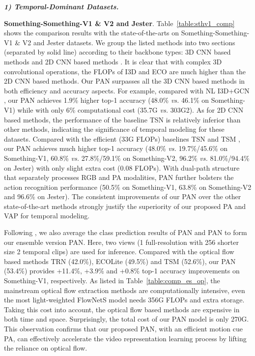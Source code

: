 \documentclass[journal]{IEEEtran}
\begin{document}
\emph{\textbf{1) Temporal-Dominant Datasets.}}

\textbf{Something-Something-V1 \& V2 and Jester}. Table~\ref{table:sthv1_comp} shows the comparison results with the state-of-the-arts on Something-Something-V1 \& V2 and Jester datasets. We group the listed methods into two sections (separated by solid line) according to their backbone types: 3D CNN based methods \cite{wang2018videos,zolfaghari2018eco} and 2D CNN based methods \cite{wang2016temporal,zhou2018temporal,lin2019tsm}. It is clear that with complex 3D convolutional operations, the FLOPs of I3D \cite{wang2018videos} and ECO \cite{zolfaghari2018eco} are much higher than the 2D CNN based methods. Our PAN surpasses all the 3D CNN based methods in both efficiency and accuracy aspects. For example, compared with NL I3D+GCN \cite{wang2018videos}, our PAN achieves 1.9\% higher top-1 accuracy (48.0\% \emph{vs.} 46.1\% on Something-V1) while with only 6\% computational cost (35.7G \emph{vs.} 303G2). As for 2D CNN based methods, the performance of the baseline TSN \cite{wang2016temporal} is relatively inferior than other methods, indicating the significance of temporal modeling for these datasets. Compared with the efficient (33G FLOPs) baselines TSN \cite{wang2016temporal} and TSM \cite{lin2019tsm}, our PAN achieves much higher top-1 accuracy (48.0\% \emph{vs.} 19.7\%/45.6\% on Something-V1, 60.8\% \emph{vs.} 27.8\%/59.1\% on Something-V2, 96.2\% \emph{vs.} 81.0\%/94.4\% on Jester) with only slight extra cost (0.08 FLOPs). With dual-path structure that separately processes RGB and PA modalities, PAN further bolsters the action recognition performance (50.5\% on Something-V1, 63.8\% on Something-V2 and 96.6\% on Jester). The consistent improvements of our PAN over the other state-of-the-art methods strongly justify the superiority of our proposed PA and VAP for temporal modeling. 

Following \cite{zolfaghari2018eco,lin2019tsm}, we also average the class prediction results of PAN and PAN to form our ensemble version PAN. Here, two views (1 full-resolution with 256 shorter size  2 temporal clips) are used for inference. Compared with the optical flow based methods TRN (42.0\%), ECOLite (49.5\%) and TSM (52.6\%), our PAN (53.4\%) provides +11.4\%, +3.9\% and +0.8\% top-1 accuracy improvements on Something-V1, respectively. As listed in Table~\ref{table:comp_es_op}, the mainstream optical flow extraction methods are computationally intensive, even the most light-weighted FlowNetS model needs 356G FLOPs and extra storage. Taking this cost into account, the optical flow based methods are expensive in both time and space. Surprisingly, the total cost of our PAN model is only 270G. This observation confirms that our proposed PAN, with an efficient motion cue PA, can effectively accelerate the video representation learning process by lifting the reliance on optical flow.
\end{document}
